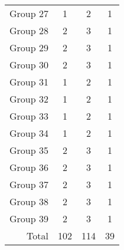\begin{table}[H]
\begin{tabular}{@{}rccc@{}}
        Group 27 & 1                                         & 2                                          & 1                                      \\
        Group 28 & 2                                         & 3                                          & 1                                      \\
        Group 29 & 2                                         & 3                                          & 1                                      \\
        Group 30 & 2                                         & 3                                          & 1                                      \\
        Group 31 & 1                                         & 2                                          & 1                                      \\
        Group 32 & 1                                         & 2                                          & 1                                      \\
        Group 33 & 1                                         & 2                                          & 1                                      \\
        Group 34 & 1                                         & 2                                          & 1                                      \\
        Group 35 & 2                                         & 3                                          & 1                                      \\
        Group 36 & 2                                         & 3                                          & 1                                      \\
        Group 37 & 2                                         & 3                                          & 1                                      \\
        Group 38 & 2                                         & 3                                          & 1                                      \\
        Group 39 & 2                                         & 3                                          & 1                                      \\ \midrule
        Total    & 102                                       & 114                                        & 39                                     \\
        \bottomrule
    \end{tabular}
\end{table}


